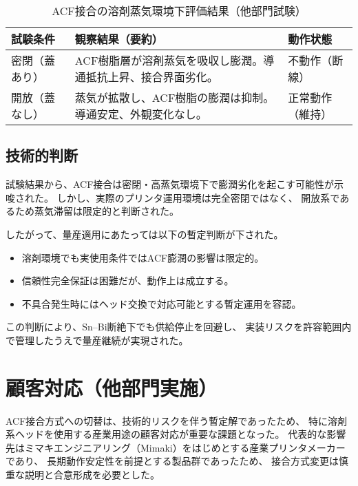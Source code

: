 \documentclass[conference]{IEEEtran}
\begin{document}
\begin{table}[t]
\centering
\footnotesize
\caption{ACF接合の溶剤蒸気環境下評価結果（他部門試験）}
\label{tab:solvent}
\renewcommand{\arraystretch}{1.1}
\begin{tabularx}{\columnwidth}{@{}p{2.4cm} Y p{2.2cm}@{}}
\toprule
試験条件 & 観察結果（要約） & 動作状態 \\
\midrule
密閉（蓋あり） &
ACF樹脂層が溶剤蒸気を吸収し膨潤。導通抵抗上昇、接合界面劣化。 &
不動作（断線） \\
\addlinespace[2pt]
開放（蓋なし） &
蒸気が拡散し、ACF樹脂の膨潤は抑制。導通安定、外観変化なし。 &
正常動作（維持） \\
\bottomrule
\end{tabularx}
\end{table}

\subsection{技術的判断}
試験結果から、ACF接合は密閉・高蒸気環境下で膨潤劣化を起こす可能性が示唆された。  
しかし、実際のプリンタ運用環境は完全密閉ではなく、  
開放系であるため蒸気滞留は限定的と判断された。  

したがって、量産適用にあたっては以下の暫定判断が下された。

\begin{itemize}
  \item 溶剤環境でも実使用条件ではACF膨潤の影響は限定的。  
  \item 信頼性完全保証は困難だが、動作上は成立する。  
  \item 不具合発生時にはヘッド交換で対応可能とする暫定運用を容認。
\end{itemize}

この判断により、Sn–Bi断絶下でも供給停止を回避し、  
実装リスクを許容範囲内で管理したうえで量産継続が実現された。

\section{顧客対応（他部門実施）}

ACF接合方式への切替は、技術的リスクを伴う暫定解であったため、  
特に溶剤系ヘッドを使用する産業用途の顧客対応が重要な課題となった。  
代表的な影響先はミマキエンジニアリング（Mimaki）をはじめとする産業プリンタメーカーであり、  
長期動作安定性を前提とする製品群であったため、  
接合方式変更は慎重な説明と合意形成を必要とした。
\end{document}
